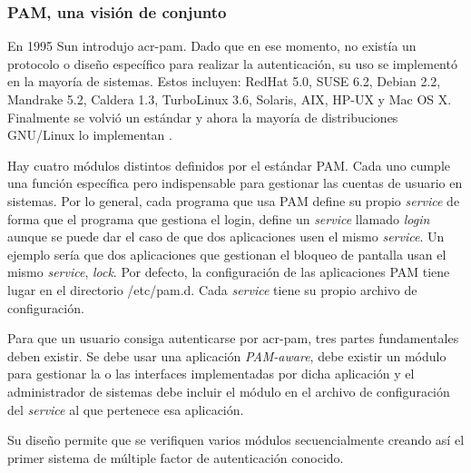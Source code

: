 \documentclass[titlepage, 12pt, a4paper]{article}
\begin{document}
\subsubsection{PAM, una visión de conjunto}
En 1995 \gls{Sun} introdujo \gls{acr-pam}. Dado que en ese momento, no existía un protocolo o diseño específico para realizar la autenticación, su uso se implementó en la mayoría de sistemas. Estos incluyen:
RedHat 5.0,
SUSE 6.2,
Debian 2.2,
Mandrake 5.2,
Caldera 1.3,
TurboLinux 3.6,
Solaris,
AIX,
HP-UX y
Mac OS X.
Finalmente se volvió un estándar y ahora la mayoría de distribuciones \gls{GNU/Linux} lo implementan \cite{IBMPAM}. \par
Hay cuatro módulos distintos definidos por el estándar PAM. Cada uno cumple una función específica pero indispensable para gestionar las cuentas de usuario en sistemas\cite{redPAM}.
Por lo general, cada programa que usa PAM define su propio \textit{service} de forma que el programa que gestiona el login, define un \textit{service} llamado \textit{login} aunque se puede dar el caso de que dos aplicaciones usen el mismo \textit{service}. Un ejemplo sería que dos aplicaciones que gestionan el bloqueo de pantalla usan el mismo \textit{service}, \textit{lock}.
Por defecto, la configuración de las aplicaciones PAM tiene lugar en el directorio /etc/pam.d. Cada \textit{service} tiene su propio archivo de configuración. \par
Para que un usuario consiga autenticarse por \gls{acr-pam}, tres partes fundamentales deben existir. Se debe usar una aplicación \textit{PAM-aware}, debe existir un módulo para gestionar la o las interfaces implementadas por dicha aplicación y el administrador de sistemas debe incluir el módulo en el archivo de configuración del \textit{service} al que pertenece esa aplicación. \par
Su diseño permite que se verifiquen varios módulos secuencialmente creando así el primer sistema de múltiple factor de autenticación conocido. \par \noindent
\end{document}
